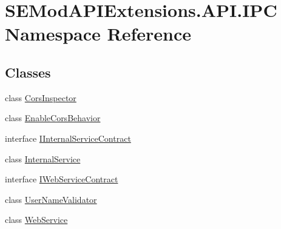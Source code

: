 \hypertarget{namespace_s_e_mod_a_p_i_extensions_1_1_a_p_i_1_1_i_p_c}{}\section{S\+E\+Mod\+A\+P\+I\+Extensions.\+A\+P\+I.\+I\+P\+C Namespace Reference}
\label{namespace_s_e_mod_a_p_i_extensions_1_1_a_p_i_1_1_i_p_c}
\subsection*{Classes}
\begin{DoxyCompactItemize}
\item 
class \hyperlink{class_s_e_mod_a_p_i_extensions_1_1_a_p_i_1_1_i_p_c_1_1_cors_inspector}{Cors\+Inspector}
\item 
class \hyperlink{class_s_e_mod_a_p_i_extensions_1_1_a_p_i_1_1_i_p_c_1_1_enable_cors_behavior}{Enable\+Cors\+Behavior}
\item 
interface \hyperlink{interface_s_e_mod_a_p_i_extensions_1_1_a_p_i_1_1_i_p_c_1_1_i_internal_service_contract}{I\+Internal\+Service\+Contract}
\item 
class \hyperlink{class_s_e_mod_a_p_i_extensions_1_1_a_p_i_1_1_i_p_c_1_1_internal_service}{Internal\+Service}
\item 
interface \hyperlink{interface_s_e_mod_a_p_i_extensions_1_1_a_p_i_1_1_i_p_c_1_1_i_web_service_contract}{I\+Web\+Service\+Contract}
\item 
class \hyperlink{class_s_e_mod_a_p_i_extensions_1_1_a_p_i_1_1_i_p_c_1_1_user_name_validator}{User\+Name\+Validator}
\item 
class \hyperlink{class_s_e_mod_a_p_i_extensions_1_1_a_p_i_1_1_i_p_c_1_1_web_service}{Web\+Service}
\end{DoxyCompactItemize}
